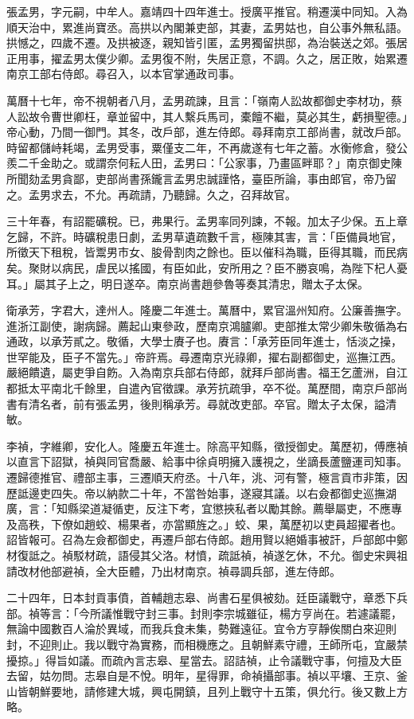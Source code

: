 \begin{pinyinscope}
張孟男，字元嗣，中牟人。嘉靖四十四年進士。授廣平推官。稍遷漢中同知。入為順天治中，累進尚寶丞。高拱以內閣兼吏部，其妻，孟男姑也，自公事外無私語。拱憾之，四歲不遷。及拱被逐，親知皆引匿，孟男獨留拱邸，為治裝送之郊。張居正用事，擢孟男太僕少卿。孟男復不附，失居正意，不調。久之，居正敗，始累遷南京工部右侍郎。尋召入，以本官掌通政司事。

萬曆十七年，帝不視朝者八月，孟男疏諫，且言：「嶺南人訟故都御史李材功，蔡人訟故令曹世卿枉，章並留中，其人繫兵馬司，橐饘不繼，莫必其生，虧損聖德。」帝心動，乃間一御門。其冬，改戶部，進左侍郎。尋拜南京工部尚書，就改戶部。時留都儲峙耗竭，孟男受事，粟僅支二年，不再歲遂有七年之蓄。水衡修倉，發公羨二千金助之。或謂奈何耘人田，孟男曰：「公家事，乃畫區畔耶？」南京御史陳所聞劾孟男貪鄙，吏部尚書孫鑨言孟男忠誠謹恪，臺臣所論，事由郎官，帝乃留之。孟男求去，不允。再疏請，乃聽歸。久之，召拜故官。

三十年春，有詔罷礦稅。已，弗果行。孟男率同列諫，不報。加太子少保。五上章乞歸，不許。時礦稅患日劇，孟男草遺疏數千言，極陳其害，言：「臣備員地官，所徵天下租稅，皆鬻男市女、朘骨割肉之餘也。臣以催科為職，臣得其職，而民病矣。聚財以病民，虐民以搖國，有臣如此，安所用之？臣不勝哀鳴，為陛下杞人憂耳。」屬其子上之，明日遂卒。南京尚書趙參魯等奏其清忠，贈太子太保。

衛承芳，字君大，達州人。隆慶二年進士。萬曆中，累官溫州知府。公廉善撫字。進浙江副使，謝病歸。薦起山東參政，歷南京鴻臚卿。吏部推太常少卿朱敬循為右通政，以承芳貳之。敬循，大學士賡子也。賡言：「承芳臣同年進士，恬淡之操，世罕能及，臣子不當先。」帝許焉。尋遷南京光祿卿，擢右副都御史，巡撫江西。嚴絕饋遺，屬吏爭自飭。入為南京兵部右侍郎，就拜戶部尚書。福王乞蘆洲，自江都抵太平南北千餘里，自遣內官徵課。承芳抗疏爭，卒不從。萬歷間，南京戶部尚書有清名者，前有張孟男，後則稱承芳。尋就改吏部。卒官。贈太子太保，謚清敏。

李禎，字維卿，安化人。隆慶五年進士。除高平知縣，徵授御史。萬歷初，傅應禎以直言下詔獄，禎與同官喬嚴、給事中徐貞明擁入護視之，坐謫長蘆鹽運司知事。遷歸德推官、禮部主事，三遷順天府丞。十八年，洮、河有警，極言貢市非策，因歷詆邊吏四失。帝以納款二十年，不當咎始事，遂寢其議。以右僉都御史巡撫湖廣，言：「知縣梁道凝循吏，反注下考，宜懲挾私者以勵其餘。薦舉屬吏，不應專及高秩，下僚如趙蛟、楊果者，亦當顯旌之。」蛟、果，萬歷初以吏員超擢者也。詔皆報可。召為左僉都御史，再遷戶部右侍郎。趙用賢以絕婚事被訐，戶部郎中鄭材復詆之。禎駁材疏，語侵其父洛。材憤，疏詆禎，禎遂乞休，不允。御史宋興祖請改材他部避禎，全大臣體，乃出材南京。禎尋調兵部，進左侍郎。

二十四年，日本封貢事僨，首輔趙志皋、尚書石星俱被劾。廷臣議戰守，章悉下兵部。禎等言：「今所議惟戰守封三事。封則李宗城雖征，楊方亨尚在。若遽議罷，無論中國數百人淪於異域，而我兵食未集，勢難遠征。宜令方亨靜俟關白來迎則封，不迎則止。我以戰守為實務，而相機應之。且朝鮮素守禮，王師所屯，宜嚴禁擾掠。」得旨如議。而疏內言志皋、星當去。詔詰禎，止令議戰守事，何擅及大臣去留，姑勿問。志皋自是不悅。明年，星得罪，命禎攝部事。禎以平壤、王京、釜山皆朝鮮要地，請修建大城，興屯開鎮，且列上戰守十五策，俱允行。後又數上方略。


\end{pinyinscope}
